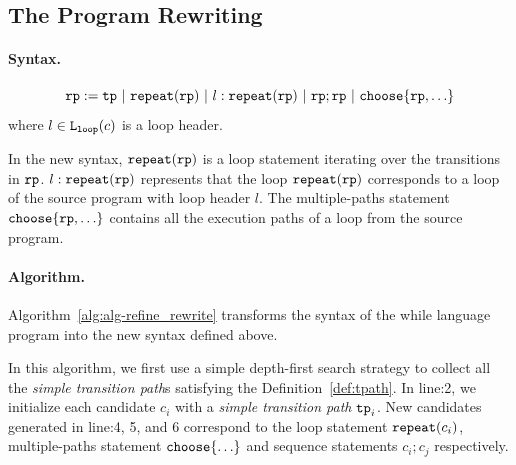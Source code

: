 \subsection{The Program Rewriting}
\paragraph{Syntax.}

\[
    \rprog := \tpath ~|~ \rprepeat(\rprog) ~|~ l : \rprepeat(\rprog) ~|~ \rprog;\rprog ~|~ \rpchoose{\rprog, \ldots} 
\]
where $l\in \mathtt{L}_{\mathtt{loop}}(c)$ is a loop header.

In the new syntax, $\mathtt{repeat}(\mathtt{rp})$ is a loop statement iterating over the transitions in $\mathtt{rp}$.
$l: \mathtt{repeat}(\mathtt{rp})$ represents that the loop $ \mathtt{repeat}(\mathtt{rp})$
corresponds to a loop of the source program with loop header $l$.
The multiple-paths statement $\rpchoose{\rprog, \ldots} $ contains all the execution paths of a loop from the source program.


\paragraph{Algorithm.}
Algorithm~\ref{alg:alg-refine_rewrite} transforms the syntax of the while language program 
into the new syntax defined above.

In this algorithm, we first use a simple depth-first search strategy to collect all the \emph{simple transition path}s satisfying the Definition~\ref{def:tpath}. 
In line:2, we initialize each candidate $c_i$ with a \emph{simple transition path} $\mathtt{tp}_i$. 
New candidates generated in line:4, 5, and 6 correspond to the loop statement $\mathtt{repeat}(c_i)$, multiple-paths statement $\rpchoose{\ldots}$ and sequence statements $c_i; c_j$ respectively.

